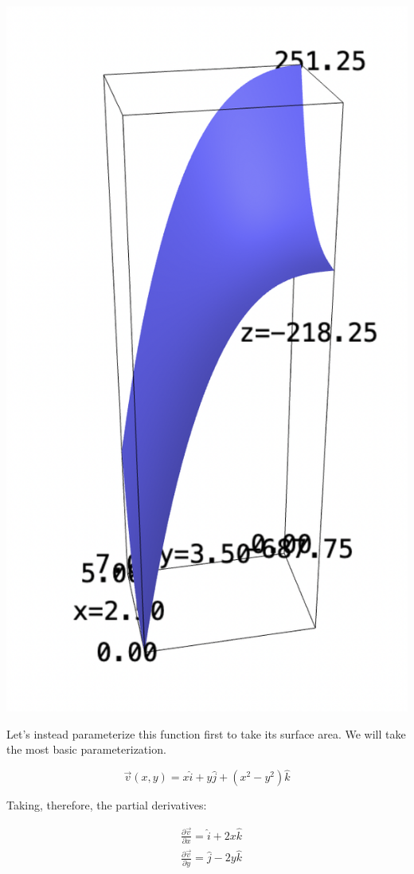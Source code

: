 \documentclass[letterpaper]{article}
\begin{document}
\begin{center}
\includegraphics[width=.9\linewidth]{2022-04-25_09-54-54_screenshot.png}
\end{center}

Let's instead parameterize this function first to take its surface area. We will take the most basic parameterization.

\begin{equation}
\vec{v}(x,y) = x \hat{i} + y \hat{j} + (x^2-y^2) \hat{k} 
\end{equation}

Taking, therefore, the partial derivatives:

\begin{align}
   &\frac{\partial \vec{v}}{\partial x} = \hat{i} + 2x \hat{k}\\
   &\frac{\partial \vec{v}}{\partial y} = \hat{j} - 2y \hat{k}
\end{align}
\end{document}
